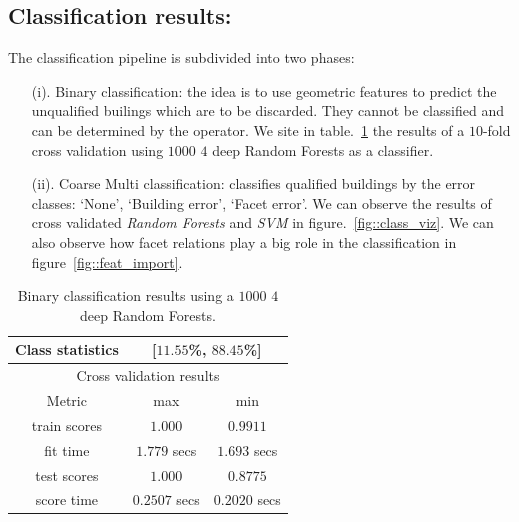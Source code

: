 \documentclass[a4paper, 11pt]{article}
\begin{document}
	\subsection{Classification results:}

	The classification pipeline is subdivided into two phases:

	\begin{itemize}
		\item[(i).] Binary classification: the idea is to use geometric features to predict the unqualified builings which are to be discarded. They cannot be classified and can be determined by the operator. We site in table.~\ref{tab::binary_rf_1000_4} the results of a $10$-fold cross validation using $1000$ $4$ deep Random Forests as a classifier.

		\item[(ii).] Coarse Multi classification: classifies qualified buildings by the error classes: `None', `Building error', `Facet error'. We can observe the results of cross validated \textit{Random Forests} and \textit{SVM} in figure.~\ref{fig::class_viz}. We can also observe how facet relations play a big role in the classification in figure~\ref{fig::feat_import}.
	\end{itemize}

	\begin{table}[H]
		\caption{\label{tab::binary_rf_1000_4}Binary classification results using a $1000$ $4$ deep Random Forests.}
		\begin{tabular}{|c|c|c|}
			\hline
			Class statistics & \multicolumn{2}{|c|}{[$11.55$\%, $88.45$\%]} \\
			\hline
			\multicolumn{3}{|c|}{Cross validation results}\\
			\hline
			Metric & max & min \\
			 \hline
			train scores & $1.000$ & $0.9911$ \\
			 \hline
			fit time & $1.779$ secs & $1.693$ secs \\
			 \hline
			test scores & $1.000$ & $0.8775$\\
			 \hline
			score time & $0.2507$ secs & $0.2020$ secs\\
			 \hline
		\end{tabular}
	\end{table}
\end{document}
